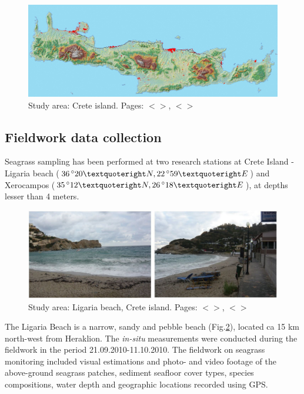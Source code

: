 \documentclass[11pt]{article}
\begin{document}
\begin{figure}[H]
	\centering
	\includegraphics[scale=0.10]{Fig-16.jpg}
	\caption{Study area: Crete island. Pages: $<$\pageref{page-2}$>$, $<$\pageref{page-23}$>$}
	\label{fig:3.1}
\end{figure}

\subsection{Fieldwork data collection}
Seagrass sampling has been performed at two research stations at Crete Island - Ligaria beach
($36\,^{\circ}20\textquoteright N, 22\,^{\circ}59\textquoteright E$) and Xerocampos ($35\,^{\circ}12\textquoteright N, 26\,^{\circ}18\textquoteright E$), at depths lesser than 4 meters. 

\begin{figure}[H]
	\centering
	\includegraphics[scale=0.25]{Fig-17.jpg}
	\caption{Study area: Ligaria beach, Crete island. Pages: $<$\pageref{page-23}$>$, $<$\pageref{page-24}$>$}
	\label{fig:3.2}
\end{figure}

The Ligaria Beach is a narrow, sandy and pebble beach (Fig.\ref{fig:3.2}), located ca 15 km north-west from Heraklion.
The \textit{in-situ} measurements were conducted during the fieldwork in the period 21.09.2010-11.10.2010.
The fieldwork on seagrass monitoring included visual estimations and photo- and video footage of the
above-ground seagrass patches, sediment seafloor cover types, species compositions, water depth and
geographic locations recorded using \ac{GPS}.
\end{document}
